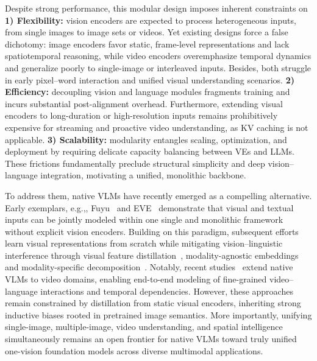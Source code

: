 \documentclass{llmxive}
\providecommand{\eg}{e.g.,\xspace}
\begin{document}
Despite strong performance, this modular design imposes inherent constraints on 
%
\textbf{1) Flexibility:}
vision encoders are expected to process heterogeneous inputs, from single images to image sets or videos. Yet existing designs force a false dichotomy: image encoders favor static, frame-level representations and lack spatiotemporal reasoning, while video encoders overemphasize temporal dynamics and generalize poorly to single-image or interleaved inputs. Besides, both struggle in early pixel–word interaction and unified visual understanding scenarios.
%
\textbf{2) Efficiency:}
decoupling vision and language modules fragments training and incurs substantial post-alignment overhead. Furthermore, extending visual encoders to long-duration or high-resolution inputs remains prohibitively expensive for streaming and proactive video understanding, as KV caching is not applicable.
%
\textbf{3) Scalability:}
modularity entangles scaling, optimization, and deployment by requiring delicate capacity balancing between VEs and LLMs. These frictions fundamentally preclude structural simplicity and deep vision–language integration, motivating a unified, monolithic backbone.


To address them, native VLMs have recently emerged as a compelling alternative. Early exemplars, \eg, Fuyu~\cite{VLM:Fuyu-8b} and EVE~\cite{VLM:EVE} demonstrate that visual and textual inputs can be jointly modeled within one single and monolithic framework without explicit vision encoders. Building on this paradigm, subsequent efforts learn visual representations from scratch while mitigating vision–linguistic interference through visual feature distillation~\cite{VLM:EVE,VLM:BREEN,VLM:VoRA}, modality-agnostic embeddings~\cite{VLM:NEO,VLM:HoVLE,VLM:HaploVL} and modality-specific decomposition~\cite{VLM:EVEv2,VLM:Mono-InternVL,VLM:Mono-InternVL-1.5}.
%
Notably, recent studies~\cite{VLM:Video-Panda,VLM:ELVA} extend native VLMs to video domains, enabling end-to-end modeling of fine-grained video–language interactions and temporal dependencies. However, these approaches remain constrained by distillation from static visual encoders, inheriting strong inductive biases rooted in pretrained image semantics. 
More importantly, unifying single-image, multiple-image, video understanding, and spatial intelligence simultaneously remains an open frontier for native VLMs toward truly unified one-vision foundation models across diverse multimodal applications.
\end{document}
